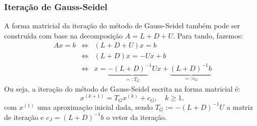 \subsubsection{Iteração de Gauss-Seidel}

A forma matricial da iteração do método de Gauss-Seidel também pode ser construída com base na decomposição $A = L + D + U$. Para tando, fazemos:
\begin{eqnarray*}
  Ax = b &\Leftrightarrow& (L + D + U)x = b\\
  &\Leftrightarrow& (L + D)x = -Ux + b\\
  &\Leftrightarrow& x = \underbrace{-(L + D)^{-1}U}_{=: T_G}x + \underbrace{(L+D)^{-1}b}_{=: c_G}
\end{eqnarray*}
Ou seja, a iteração do método de Gauss-Seidel escrita na forma matricial é:
\begin{equation*}
  x^{(k+1)} = T_Gx^{(k)} + c_G,\quad k\geq 1,
\end{equation*}
com $x^{(1)}$ uma aproximação inicial dada, sendo $T_G := -(L+D)^{-1}U$ a matriz de iteração e $c_J = (L+D)^{-1}b$ o vetor da iteração.

